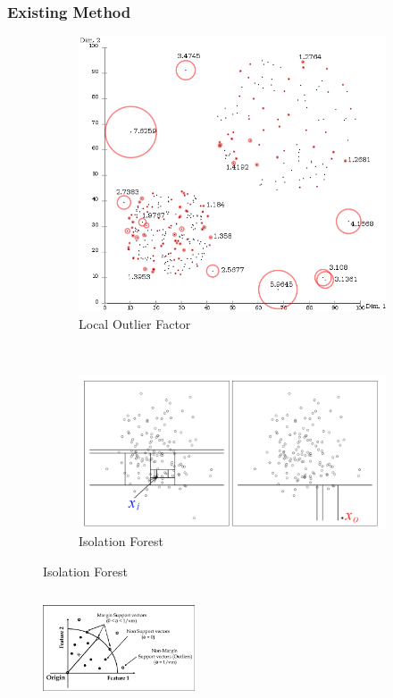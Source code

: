 \documentclass[notheorems]{beamer}
\begin{document}
\begin{frame}
\frametitle{Existing Method}
\begin{figure}
	\centering
	\begin{subfigure}{0.33\textwidth}
		\includegraphics[width=\textwidth]{pic/lof.png}
		\caption{Local Outlier Factor}
	\end{subfigure}~
	\begin{subfigure}{0.58\textwidth}
		\includegraphics[width=\textwidth]{pic/if.png}
		\caption{Isolation Forest}
	\end{subfigure}
\end{figure}  
	\begin{columns}
\begin{figure}
		\includegraphics[width=4.5cm]{pic/one_class_svm.png}

\end{figure}
\end{columns}
\end{frame}
\end{document}
